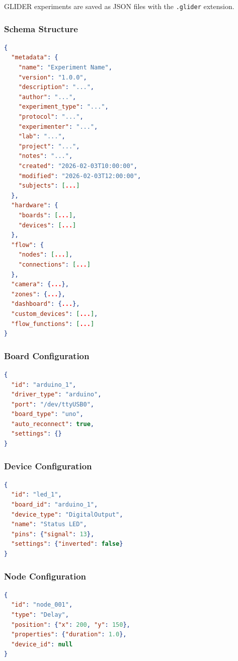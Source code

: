 \documentclass[11pt,a4paper]{article}
\begin{document}
GLIDER experiments are saved as JSON files with the \texttt{.glider} extension.

\subsubsection{Schema Structure}

\begin{lstlisting}[language=json]
{
  "metadata": {
    "name": "Experiment Name",
    "version": "1.0.0",
    "description": "...",
    "author": "...",
    "experiment_type": "...",
    "protocol": "...",
    "experimenter": "...",
    "lab": "...",
    "project": "...",
    "notes": "...",
    "created": "2026-02-03T10:00:00",
    "modified": "2026-02-03T12:00:00",
    "subjects": [...]
  },
  "hardware": {
    "boards": [...],
    "devices": [...]
  },
  "flow": {
    "nodes": [...],
    "connections": [...]
  },
  "camera": {...},
  "zones": {...},
  "dashboard": {...},
  "custom_devices": [...],
  "flow_functions": [...]
}
\end{lstlisting}

\subsubsection{Board Configuration}

\begin{lstlisting}[language=json]
{
  "id": "arduino_1",
  "driver_type": "arduino",
  "port": "/dev/ttyUSB0",
  "board_type": "uno",
  "auto_reconnect": true,
  "settings": {}
}
\end{lstlisting}

\subsubsection{Device Configuration}

\begin{lstlisting}[language=json]
{
  "id": "led_1",
  "board_id": "arduino_1",
  "device_type": "DigitalOutput",
  "name": "Status LED",
  "pins": {"signal": 13},
  "settings": {"inverted": false}
}
\end{lstlisting}

\subsubsection{Node Configuration}

\begin{lstlisting}[language=json]
{
  "id": "node_001",
  "type": "Delay",
  "position": {"x": 200, "y": 150},
  "properties": {"duration": 1.0},
  "device_id": null
}
\end{lstlisting}
\end{document}
